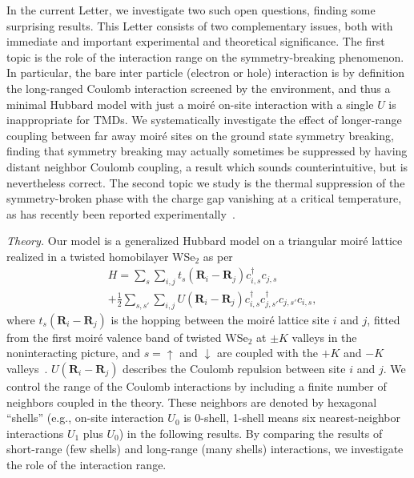 \documentclass[aps,prb,twocolumn,superscriptaddress,longbibliography]{revtex4-2}
\newcommand{\anno}[1]{}
\begin{document}
In the current Letter, we investigate two such open questions, finding some surprising results.  This Letter consists of two complementary issues, both with immediate and important experimental and theoretical significance.  The first topic is the role of the interaction range on the symmetry-breaking phenomenon.  In particular, the bare inter particle (electron or hole) interaction is by definition the long-ranged Coulomb interaction screened by the environment, and thus a minimal Hubbard model with just a moir\'e on-site interaction with a single $U$ is inappropriate for TMDs.  We systematically investigate the effect of longer-range coupling between far away moir\'e sites on the ground state symmetry breaking, finding that symmetry breaking may actually sometimes be suppressed by having distant neighbor Coulomb coupling, a result which sounds counterintuitive, but is nevertheless correct.  The second topic we study is the thermal suppression of the symmetry-broken phase with the charge gap vanishing at a critical temperature, as has recently been reported experimentally~\cite{ghiotto2021quantum}. \anno{[cite the recent Columbia Nature]} 




\textit{Theory.} Our model is a generalized Hubbard model on a triangular moir\'e lattice realized in a twisted homobilayer WSe$_2$ as per
\begin{equation}\label{eq:H}
    \begin{split}
        &H=\sum_{s}\sum_{i,j}^{} t_{s}\left(\bm{R}_i-\bm{R}_j\right) c_{i,s}^\dagger c_{j,s}\\
        &+\frac{1}{2}\sum_{s,s'}\sum_{i,j}U(\bm{R}_i-\bm{R}_j) c_{i,s}^\dagger c_{j,s'}^\dagger c_{j,s'} c_{i,s},
    \end{split}
\end{equation}
where $t_{s}\left(\bm{R}_i-\bm{R}_j\right)$ is the hopping between the moir\'e lattice site $i$ and $j$, fitted from the first moir\'e valence band of twisted WSe$_2$ at $\pm K$ valleys in the noninteracting picture, and $s=\uparrow$ and $ \downarrow$ are coupled with the $+K$ and $-K$ valleys~\cite{pan2020band}. $U(\bm{R}_i-\bm{R}_j)$ describes the Coulomb repulsion between site $i$ and $j$. We control the range of the Coulomb interactions by including a finite number of neighbors coupled in the theory. These neighbors are denoted by hexagonal ``shells''  (e.g., on-site interaction $U_0$ is 0-shell, 1-shell means six nearest-neighbor interactions $U_1$ plus $U_0$) in the following results. By comparing the results of short-range (few shells) and long-range (many shells) interactions, we investigate the role of the interaction range.
\end{document}
